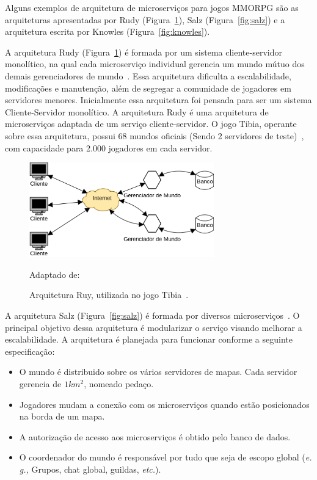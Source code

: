 Alguns exemplos de arquitetura de microserviços para jogos \ac{MMORPG} são as arquiteturas apresentadas por Rudy (Figura~\ref{fig:rudy}), Salz (Figura~\ref{fig:salz}) e a arquitetura escrita por Knowles (Figura~\ref{fig:knowles}).

A arquitetura Rudy (Figura~\ref{fig:rudy}) é formada por um sistema cliente-servidor monolítico, na qual cada microserviço individual gerencia um mundo mútuo dos demais gerenciadores de mundo~\cite{matthiasrudy2011}.
%
Essa arquitetura dificulta a escalabilidade, modificações e manutenção\cite{8169955}, além de segregar a comunidade de jogadores em servidores menores\cite{matthiasrudy2011}.
%
Inicialmente essa arquitetura foi pensada para ser um sistema Cliente-Servidor monolítico.
%
A arquitetura Rudy é uma arquitetura de microserviços adaptada de um serviço cliente-servidor\cite{matthiasrudy2011}.
%
O jogo Tibia, operante sobre essa arquitetura, possui 68 mundos oficiais (Sendo 2 servidores de teste)~\cite{matthiasrudy2011}, com capacidade para 2.000 jogadores em cada servidor.

\begin{figure}[htb!]
  \caption{Arquitetura Ruy, utilizada no jogo Tibia~\cite{matthiasrudy2011}.}
  \label{fig:rudy}
  \includegraphics[width=8cm]{arquiteturas/rudy.png}
  \centering

  Adaptado de:~\cite{matthiasrudy2011}
\end{figure}

A arquitetura Salz (Figura~\ref{fig:salz}) é formada por diversos microserviços~\cite{albion_online_unite}.
%
O principal objetivo dessa arquitetura é modularizar o serviço visando melhorar a escalabilidade.
%
A arquitetura é planejada para funcionar conforme a seguinte especificação\cite{albion_online_unite}:

\begin{itemize}
  \item O mundo é distribuido sobre os vários servidores de mapas. Cada servidor gerencia de $1km^{2}$, nomeado pedaço.
  \item Jogadores mudam a conexão com os microserviços quando estão posicionados na borda de um mapa.
  \item A autorização de acesso aos microserviços é obtido pelo banco de dados.
  \item O coordenador do mundo é responsável por tudo que seja de escopo global (\textit{e. g.,} Grupos, chat global, guildas, \textit{etc.}).
\end{itemize}

